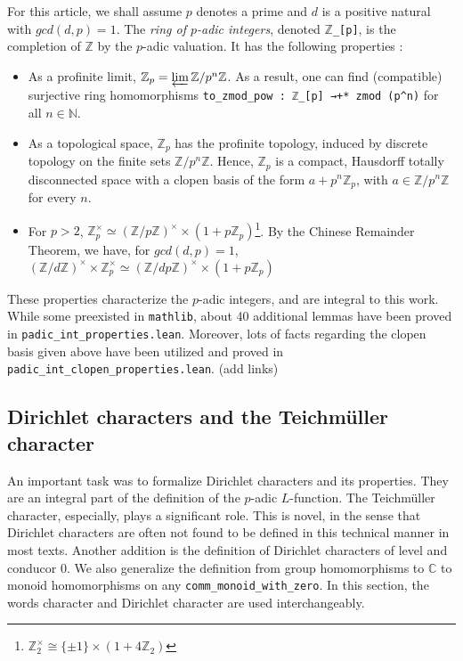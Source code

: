 \documentclass[11pt]{article}
\newcommand{\lean}[1]{\texttt{#1}\xspace} %
\begin{document}
For this article, we shall assume $p$ denotes a prime and $d$ is a positive natural with 
$gcd (d, p) = 1$. The \textit{ring of $p$-adic integers}, denoted \lean{$\mathbb{Z}$\_[p]}, is the completion of $\mathbb{Z}$ by the $p$-adic
valuation. It has the following properties :
\begin{itemize}
  \item As a profinite limit, $\mathbb{Z}_p = \varprojlim \mathbb{Z} / p^n \mathbb{Z}$. As a result,
  one can find (compatible) surjective ring homomorphisms \lean{to\_zmod\_pow : ℤ\_[p] →+* zmod (p\textasciicircum n)} for all $n \in \mathbb{N}$.
  \item As a topological space, $\mathbb{Z}_p$ has the profinite topology, induced by discrete topology
  on the finite sets $\mathbb{Z} / p^n \mathbb{Z}$. Hence, $\mathbb{Z}_p$ is a compact, Hausdorff totally disconnected space
  with a clopen basis of the form $a + p^n \mathbb{Z}_p$, with $a \in \mathbb{Z} / p^n \mathbb{Z}$ for
  every $n$.
  \item For $p > 2$, $\mathbb{Z}_p^{\times} ≃ (\mathbb{Z}/p \mathbb{Z})^{\times} \times (1 + p \mathbb{Z}_p)$\footnote{$\mathbb{Z}_2^{\times} \cong \{ \pm 1 \} \times (1 + 4 \mathbb{Z}_2)$}.
  By the Chinese Remainder Theorem, we have, for $gcd(d, p) = 1$,
  $(\mathbb{Z}/d\mathbb{Z})^{\times} \times \mathbb{Z}_p^{\times} ≃
  (\mathbb{Z}/dp \mathbb{Z})^{\times} \times (1 + p \mathbb{Z}_p)$
\end{itemize}

These properties characterize the $p$-adic integers, and are integral to this work. While some preexisted in 
\texttt{mathlib}, about 40 additional lemmas have been proved in \lean{padic\_int\_properties.lean}. 
Moreover, lots of facts regarding the clopen basis given above have been utilized and proved in \lean{padic\_int\_clopen\_properties.lean}. (add links)

\subsection{Dirichlet characters and the Teichmüller character}
An important task was to formalize Dirichlet characters and its properties. They are an integral part of the definition of the $p$-adic $L$-function. 
The Teichmüller character, especially, plays a significant role. This is novel, in the sense that Dirichlet characters are often not found to be defined 
in this technical manner in most texts. Another addition is the definition of Dirichlet characters of level and conducor 0. We also generalize the 
definition from group homomorphisms to $\mathbb{C}$ to monoid homomorphisms on any \lean{comm\_monoid\_with\_zero}. 
In this section, the words character and Dirichlet character are used interchangeably. \\
\end{document}
